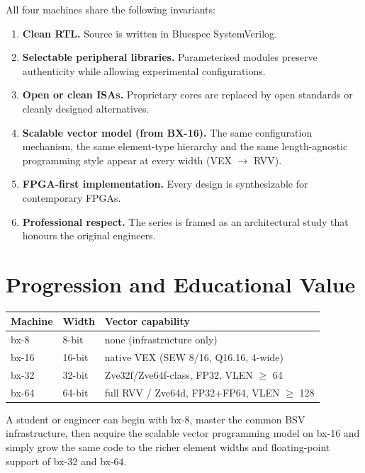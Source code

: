 \documentclass[11pt,a4paper]{article}
\begin{document}
All four machines share the following invariants:

\begin{enumerate}[leftmargin=1.5em]
  \item \textbf{Clean RTL.} Source is written in Bluespec SystemVerilog.
  \item \textbf{Selectable peripheral libraries.} Parameterised modules preserve authenticity while allowing experimental configurations.
  \item \textbf{Open or clean ISAs.} Proprietary cores are replaced by open standards or cleanly designed alternatives.
  \item \textbf{Scalable vector model (from BX-16).} The same configuration mechanism, the same element-type hierarchy and the same length-agnostic programming style appear at every width (VEX $\rightarrow$ RVV).
  \item \textbf{FPGA-first implementation.} Every design is synthesizable for contemporary FPGAs.
  \item \textbf{Professional respect.} The series is framed as an architectural study that honours the original engineers.
\end{enumerate}

\section{Progression and Educational Value}

\begin{center}
\begin{tabular}{@{}llp{6.2cm}@{}}
\toprule
\textbf{Machine} & \textbf{Width} & \textbf{Vector capability} \\
\midrule
bx-8  & 8-bit  & none (infrastructure only) \\
bx-16 & 16-bit & native VEX (SEW 8/16, Q16.16, 4-wide) \\
bx-32 & 32-bit & Zve32f/Zve64f-class, FP32, VLEN $\ge$ 64 \\
bx-64 & 64-bit & full RVV / Zve64d, FP32+FP64, VLEN $\ge$ 128 \\
\bottomrule
\end{tabular}
\end{center}

A student or engineer can begin with bx-8, master the common BSV infrastructure, then acquire the scalable vector programming model on bx-16 and simply grow the same code to the richer element widths and floating-point support of bx-32 and bx-64.
\end{document}
